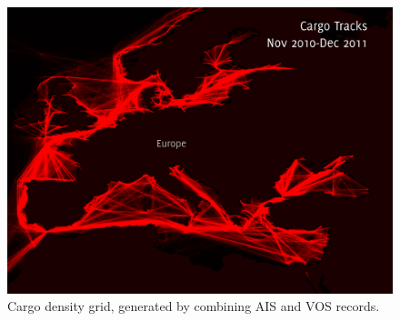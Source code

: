 \begin{figure}[h!]
  \centering
    \includegraphics[width=120mm]{figures/cargo-lanes-eu-red-labeled.pdf}
  \caption[Cargo density, Europe]{Cargo density grid, generated by combining AIS and VOS records.}
  \label{fig:eu-cargo-density}
\end{figure}






